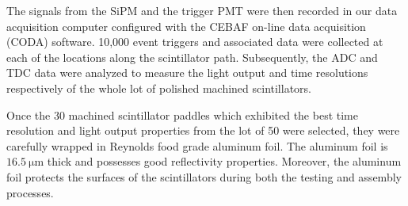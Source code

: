 The signals from the SiPM and the trigger PMT were then recorded in our data acquisition computer configured with the CEBAF on-line data acquisition (CODA) software.  10,000 event triggers and associated data were collected at each of the locations along the scintillator path.  Subsequently, the ADC and TDC data were analyzed to measure the light output and time resolutions respectively of the whole lot of polished machined scintillators.  

Once the 30 machined scintillator paddles which exhibited the best time resolution and light output properties from the lot of 50 were selected, they were carefully wrapped in Reynolds food grade aluminum foil.  The aluminum foil is $\mathrm{16.5~\mu m}$ thick and possesses good reflectivity properties.  Moreover, the aluminum foil protects the surfaces of the scintillators during both the testing and assembly processes.
  
